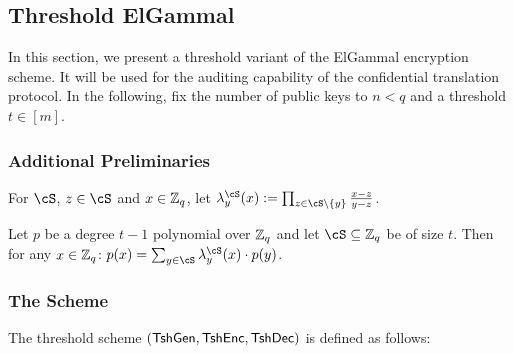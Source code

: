 \newcommand{\tdEnc}{\MathAlgX{TshEnc}}
\newcommand{\tdDec}{\MathAlgX{TshDec}}

\subsection{Threshold ElGammal}\label{sec:ChanksEg:TshEG}	
In this section, we present   a threshold  variant of the ElGammal encryption scheme. It will be used for the  auditing capability  of the confidential translation protocol.   In the following, fix the number of public keys to $n<q$ and a threshold $t \in [m]$. 


\subsubsection{Additional Preliminaries}\label{sec:ChanksEg:TshEG:Pre}	




\begin{notation}
 	For $\cS$, $z\in \cS$ and $x\in {\mathbb Z}_q$, let $\lambda_y^\cS(x) \eqdef \prod_{z \in \cS \setminus \set{y}} \frac{x-z}{y-z}$.
\end{notation}

\begin{fact}
	Let $p$ be a  degree $t-1$ polynomial over ${\mathbb Z}_q$ and let $\cS \subseteq \Z_q$  be of size $t$.  Then for  any $x\in {\mathbb Z}_q$: $p(x) = \sum_{y \in \cS}   \lambda_y^\cS(x) \cdot p(y)$.
\end{fact}

\subsubsection{The Scheme}
The threshold scheme  $(\tdKg,\tdEnc,\tdDec)$ is defined as follows:



